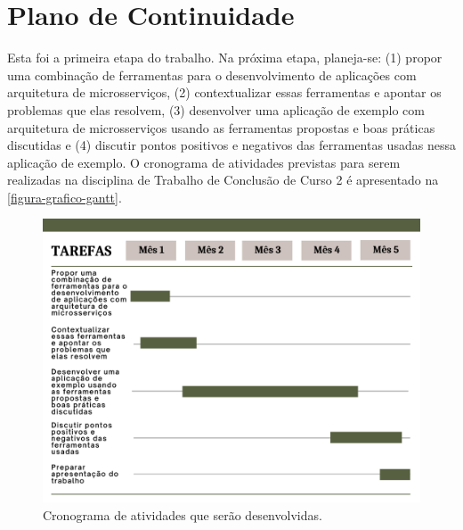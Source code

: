\chapter{Plano de Continuidade}

Esta foi a primeira etapa do trabalho. Na próxima etapa, planeja-se: (1) propor uma combinação de ferramentas para o desenvolvimento de aplicações com arquitetura de microsserviços, (2) contextualizar essas ferramentas e apontar os problemas que elas resolvem, (3) desenvolver uma aplicação de exemplo com arquitetura de microsserviços usando as ferramentas propostas e boas práticas discutidas e (4) discutir pontos positivos e negativos das ferramentas usadas nessa aplicação de exemplo. O cronograma de atividades previstas para serem realizadas na disciplina de Trabalho de Conclusão de Curso 2 é apresentado na \autoref{figura-grafico-gantt}.

\begin{figure}[htb]
	\caption{\label{figura-grafico-gantt}Cronograma de atividades que serão desenvolvidas.}
	\begin{center}
	    \includegraphics[scale=0.5]{Imagens/grafico-gantt.pdf}
	\end{center}
\end{figure}
